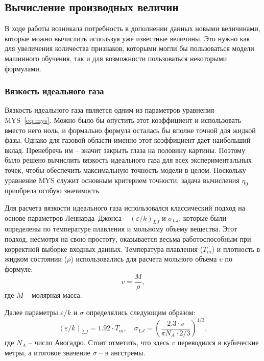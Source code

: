 \documentclass[a4paper,12pt]{article}
\begin{document}
  \subsection{Вычисление производных величин}
    В ходе работы возникала потребность в дополнении данных новыми величинами, которые можно вычислить используя уже известные величины. Это нужно как для увеличения количества признаков, которыми могли бы пользоваться модели машинного обучения, так и для возможности пользоваться некоторыми формулами.
    
    \subsubsection{Вязкость идеального газа}
      Вязкость идеального газа является одним из параметров уравнения MYS~\eqref{eq:mys}. Можно было бы опустить этот коэффициент и использовать вместо него ноль, и формально формула осталась бы вполне точной для жидкой фазы. Однако для газовой области именно этот коэффициент дает наибольший вклад. Пренебречь им -- значит закрыть глаза на половину картины. Поэтому было решено вычислить вязкость идеального газа для всех экспериментальных точек, чтобы обеспечить максимальную точность модели в целом. Поскольку уравнение MYS служит основным критерием точности, задача вычисления $\eta_0$ приобрела особую значимость.

      Для расчета вязкости идеального газа использовался классический подход на основе параметров Леннарда--Джонса -- $(\varepsilon/k)_{LJ}$ и $\sigma_{LJ}$, которые были определены по температуре плавления и мольному объему вещества. Этот подход, несмотря на свою простоту, оказывается весьма работоспособным при корректной выборке входных данных. Температура плавления ($T_m$) и плотность в жидком состоянии ($\rho$) использовались для расчета мольного объема $v$ по формуле:
      \[
      v = \frac{M}{\rho},
      \]
      где $M$ -- молярная масса.
      
      Далее параметры $\varepsilon/k$ и $\sigma$ определялись следующим образом:
      \[
        (\varepsilon/k)_{LJ} = 1.92 \cdot T_m, \quad 
        \sigma_{LJ} = \left( \frac{2.3 \cdot v}{\pi N_A \cdot 2/3} \right)^{1/3},
      \]
      где $N_A$ -- число Авогадро. Стоит отметить, что здесь $v$ переводился в кубические метры, а итоговое значение $\sigma$ -- в ангстремы.
     
\end{document}
